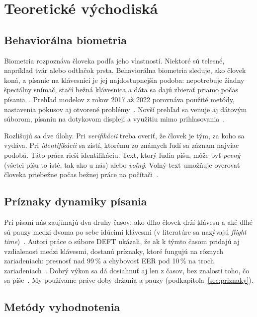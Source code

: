 \section{Teoretické východiská}
\label{sec:teoria}


\subsection{Behaviorálna biometria}

Biometria rozpoznáva človeka podľa jeho vlastností. Niektoré sú telesné,
napríklad tvár alebo odtlačok prsta. Behaviorálna biometria sleduje, ako človek
koná, a písanie na klávesnici je jej najdostupnejšia podoba: nepotrebuje žiadny
špeciálny snímač, stačí bežná klávesnica a dáta sa dajú zbierať priamo počas
písania~\cite{roy2022,shadman2023}. Prehľad modelov z rokov 2017 až 2022
porovnáva použité metódy, nastavenia pokusov aj otvorené problémy~\cite{roy2022}.
Novší prehľad sa venuje aj dátovým súborom, písaniu na dotykovom displeji
a využitiu mimo prihlasovania~\cite{shadman2023}.

Rozlišujú sa dve úlohy. Pri \emph{verifikácii} treba overiť, že človek je tým,
za koho sa vydáva. Pri \emph{identifikácii} sa zistí, ktorému zo známych ľudí sa
záznam najviac podobá. Táto práca rieši identifikáciu. Text, ktorý ľudia píšu,
môže byť \emph{pevný} (všetci píšu to isté, tak ako u nás) alebo \emph{voľný}.
Voľný text umožňuje overovať človeka priebežne počas bežnej práce na
počítači~\cite{shadman2023}.

\subsection{Príznaky dynamiky písania}

Pri písaní nás zaujímajú dva druhy časov: ako dlho človek drží klávesu a aké
dlhé sú pauzy medzi dvoma po sebe idúcimi klávesmi (v literatúre sa nazývajú
\emph{flight time})~\cite{kaluarachchi2023}. Autori práce o súbore DEFT ukázali,
že ak k týmto časom pridajú aj vzdialenosť medzi klávesmi, dostanú príznaky, ktoré
fungujú na rôznych zariadeniach: presnosť nad 99\,\% a chybovosť EER pod 10\,\%
na troch zariadeniach~\cite{kaluarachchi2023}. Dobrý výkon sa dá dosiahnuť aj
len z časov, bez znalosti toho, čo sa píše~\cite{stragapede2023}. My používame
práve doby držania a pauzy (podkapitola~\ref{sec:priznaky}).

\subsection{Metódy vyhodnotenia}

